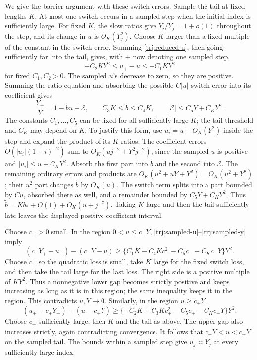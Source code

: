 We give the barrier argument with these switch errors.  Sample the tail
at fixed lengths \(K\).  At most one switch occurs in a sampled step
when the initial index is sufficiently large.  For fixed \(K\), the
slow ratios give \(Y_i/Y_j=1+o(1)\) throughout the step, and its change
in \(u\) is \(O_K(Y_j^2)\).  Choose \(K\) larger than a fixed multiple
of the constant in the switch error.  Summing
\eqref{trj:reduced-u}, then going sufficiently far into the tail,
gives, with \(+\) now denoting one sampled step,
\begin{equation}\label{trj:sampled-u}
                  -C_2 K Y^2\le u_+-u\le -C_1 K Y^2
\end{equation}
for fixed \(C_1,C_2>0\).  The sampled \(u\)'s decrease to zero,
so they are positive.  Summing the ratio equation and absorbing the
possible \(C|u|\) switch error into its coefficient gives
\begin{equation}\label{trj:sampled-y}
 \frac{Y_+}{Y}=1-\widetilde b u+\mathcal E,
 \qquad C_3K\le\widetilde b\le C_4K,\qquad
 |\mathcal E|\le C_5Y+C_KY^2.
\end{equation}
The constants \(C_1,\ldots,C_5\) can be fixed for all sufficiently
large \(K\); the tail threshold and \(C_K\) may depend on \(K\).
To justify this form, use \(u_i=u+O_K(Y^2)\) inside the step and expand
the product of its \(K\) ratios.  The coefficient errors
\(O(|u_i|(1+i)^{-2})\) sum to
\(O_K(uj^{-2}+Y^2j^{-2})\), since the sampled \(u\) is positive
and \(|u_i|\le u+C_KY^2\).  Absorb the first part into
\(\widetilde b\) and the second into \(\mathcal E\).
The remaining ordinary errors and products are
\(O_K(u^2+uY+Y^2)=O_K(u^2+Y^2)\); their \(u^2\) part changes
\(\widetilde b\) by \(O_K(u)\).  The switch term splits into a part
bounded by \(Cu\), absorbed there as well, and a remainder bounded by
\(C_5Y+C_KY^2\).  Thus
\(\widetilde b=Kb_*+O(1)+O_K(u+j^{-2})\).
Taking \(K\) large and then the tail sufficiently late leaves the
displayed positive coefficient interval.

Choose \(c_->0\) small.  In the region \(0<u\le c_-Y\),
\eqref{trj:sampled-u}--\eqref{trj:sampled-y} imply
\[
 (c_-Y_+-u_+)-(c_-Y-u)
 \ge \{C_1K-C_4Kc_-^2-C_5c_--C_Kc_-Y\}Y^2.
\]
Choose \(c_-\) so the quadratic loss is small, take \(K\) large for
the fixed switch loss, and then take the tail large for the last loss.
The right side is a positive multiple of \(KY^2\).  Thus a nonnegative
lower gap becomes strictly positive and keeps increasing as long as it
is in this region; the same inequality keeps it in the region.  This
contradicts \(u,Y\to0\).  Similarly, in the region \(u\ge c_+Y\),
\[
 (u_+-c_+Y_+)-(u-c_+Y)
 \ge \{-C_2K+C_3Kc_+^2-C_5c_+-C_Kc_+Y\}Y^2.
\]
Choose \(c_+\) sufficiently large, then \(K\) and the tail as above.
The upper gap also increases strictly, again contradicting convergence.
It follows that \(c_-Y<u<c_+Y\) on the sampled tail.  The bounds within
a sampled step give \(u_j\asymp Y_j\) at every sufficiently large index.

